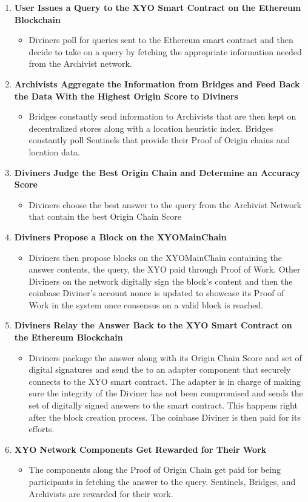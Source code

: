 \documentclass{article}
\begin{document}
\begin{enumerate}
  \item \textbf{User Issues a Query to the XYO Smart Contract on the Ethereum Blockchain}
  \begin{itemize}
    \item Diviners poll for queries sent to the Ethereum smart contract and then decide to take on a query by fetching the appropriate information needed from the Archivist network.
  \end{itemize}
  \item \textbf{Archivists Aggregate the Information from Bridges and Feed Back the Data With the Highest Origin Score to Diviners}
  \begin{itemize}
    \item Bridges constantly send information to Archivists that are then kept on decentralized stores along with a location heuristic index. Bridges constantly poll Sentinels that provide their Proof of Origin chains and location data.
  \end{itemize}
  \item \textbf{Diviners Judge the Best Origin Chain and Determine an Accuracy Score}
  \begin{itemize}
    \item Diviners choose the best answer to the query from the Archivist Network that contain the best Origin Chain Score
  \end{itemize}
  \item \textbf{Diviners Propose a Block on the XYOMainChain}
  \begin{itemize}
    \item Diviners then propose blocks on the XYOMainChain containing the answer contents, the query, the XYO paid through Proof of Work. Other Diviners on the network digitally sign the block's content and then the coinbase Diviner's account nonce is updated to showcase its Proof of Work in the system once consensus on a valid block is reached.
  \end{itemize}
  \item \textbf{Diviners Relay the Answer Back to the XYO Smart Contract on the Ethereum Blockchain}
  \begin{itemize}
    \item Diviners package the answer along with its Origin Chain Score and set of digital signatures and send the to an adapter component that securely connects to the XYO smart contract. The adapter is in charge of making sure the integrity of the Diviner has not been compromised and sends the set of digitally signed answers to the smart contract. This happens right after the block creation process. The coinbase Diviner is then paid for its efforts.
  \end{itemize}
  \item \textbf{XYO Network Components Get Rewarded for Their Work}
  \begin{itemize}
    \item The components along the Proof of Origin Chain get paid for being participants in fetching the answer to the query. Sentinels, Bridges, and Archivists are rewarded for their work.
  \end{itemize}
\end{enumerate}
\end{document}
